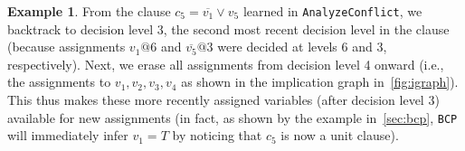 \documentclass[oneside,11pt,dvipsnames]{book}
\numberwithin{equation}{section}
\theoremstyle{definition}
\newtheorem{example}{Example}[section]
\theoremstyle{remark}
\newcommand{\tvn}[1]{\iftoggle{usecomment}{{\color{red}{[TVN]: #1}}}{}}
\newcommand{\hd}[1]{\iftoggle{usecomment}{{\color{blue}{[HD]: #1}}}{}}
\begin{document}
\begin{example}

    From the clause $c_5=\overline{v_1} \lor v_5$ learned in \texttt{AnalyzeConflict}, we backtrack to decision level 3, the second most recent decision level in the clause (because assignments $v_1@6$  and $\overline{v_5}@3$ were decided at levels 6 and 3, respectively). Next, we erase all assignments from decision level 4 onward (i.e., the assignments to $v_1,v_2,v_3,v_4$ as shown in the implication graph in~\autoref{fig:igraph}). This thus makes these more recently assigned variables (after decision level 3) available for new assignments (in fact, as shown by the example in~\autoref{sec:bcp}, \texttt{BCP} will immediately infer $v_1=T$ by noticing that $c_5$ is now a unit clause).
\end{example}







\end{document}
